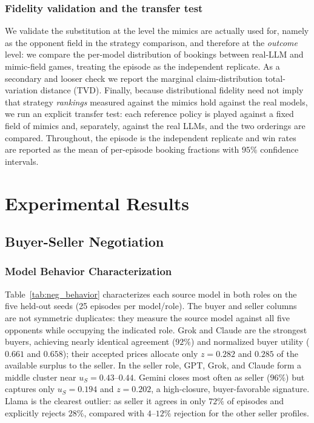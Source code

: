 \documentclass[conference]{IEEEtran}
\begin{document}
\subsubsection{Fidelity validation and the transfer test}
\label{sec:dec5-fidelity-method}
We validate the substitution at the level the mimics are actually used for, namely as the opponent field in the strategy comparison, and therefore at the \emph{outcome} level: we compare the per-model distribution of bookings between real-LLM and mimic-field games, treating the episode as the independent replicate. As a secondary and looser check we report the marginal claim-distribution total-variation distance (TVD). Finally, because distributional fidelity need not imply that strategy \emph{rankings} measured against the mimics hold against the real models, we run an explicit transfer test: each reference policy is played against a fixed field of mimics and, separately, against the real LLMs, and the two orderings are compared. Throughout, the episode is the independent replicate and win rates are reported as the mean of per-episode booking fractions with $95\%$ confidence intervals.

\section{Experimental Results}


\subsection{Buyer-Seller Negotiation}

\subsubsection{Model Behavior Characterization}

Table~\ref{tab:neg_behavior} characterizes each source model in both roles on the five held-out seeds (25 episodes per model/role). The buyer and seller columns are not symmetric duplicates: they measure the source model against all five opponents while occupying the indicated role. Grok and Claude are the strongest buyers, achieving nearly identical agreement ($92\%$) and normalized buyer utility ($0.661$ and $0.658$); their accepted prices allocate only $z=0.282$ and $0.285$ of the available surplus to the seller. In the seller role, GPT, Grok, and Claude form a middle cluster near $u_S=0.43$--$0.44$. Gemini closes most often as seller ($96\%$) but captures only $u_S=0.194$ and $z=0.202$, a high-closure, buyer-favorable signature. Llama is the clearest outlier: as seller it agrees in only $72\%$ of episodes and explicitly rejects $28\%$, compared with $4$--$12\%$ rejection for the other seller profiles.
\end{document}
